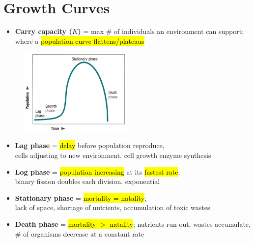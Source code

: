 \documentclass[a4paper,12pt]{article}
\begin{document}
\section{Growth Curves}
\begin{itemize}
    \item{\textbf{Carry capacity ($K$)} = max \# of individuals an environment can support; \\ where a \hl{population curve flattens/plateaus}}
\end{itemize}
\begin{figure}[H]
    \centering
    \includegraphics[width=0.50\textwidth]{curve}
\end{figure}
\begin{itemize}
    \item{\textbf{Lag phase} = \hl{delay} before population reproduce, \\ cells adjusting to new environment, cell growth enzyme synthesis}
    \item{\textbf{Log phase} = \hl{population increasing} at its \hl{fastest rate}; \\ binary fission doubles each division, exponential}
    \item{\textbf{Stationary phase} = \hl{mortality = natality}; \\ lack of space, shortage of nutrients, accumulation of toxic wastes}
    \item{\textbf{Death phase} = \hl{mortality $>$ natality}; nutrients run out, wastes accumulate, \\ \# of organisms decrease at a constant rate}
\end{itemize}

\pagebreak
\end{document}
